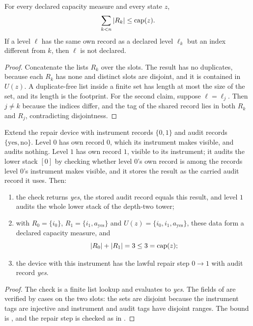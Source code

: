 \begin{theorem}\label{thm:e2-declared}
For every declared capacity measure and every state $z$,
\[
  \sum_{k<n} |R_k| \le \operatorname{cap}(z).
\]
If a level $\ell$ has the same own record as a declared level $\ell_k$ but an index different
from $k$, then $\ell$ is not declared.
\end{theorem}

\begin{proof}
Concatenate the lists $R_k$ over the slots. The result has no duplicates, because each $R_k$ has
none and distinct slots are disjoint, and it is contained in $U(z)$. A duplicate-free list inside a
finite set has length at most the size of the set, and its length is the footprint. For the second
claim, suppose $\ell = \ell_j$. Then $j \ne k$ because the indices differ, and the tag of the shared
record lies in both $R_k$ and $R_j$, contradicting disjointness.
\end{proof}

\begin{theorem}\label{thm:e2-tower}
Extend the repair device with instrument records $\{0, 1\}$ and audit records $\{\text{yes},
\text{no}\}$. Level $0$ has own record $0$, which its instrument makes visible, and audits nothing.
Level $1$ has own record $1$, visible to its instrument; it audits the lower stack $[0]$ by checking
whether level $0$'s own record is among the records level $0$'s instrument makes visible, and it
stores the result as the carried audit record it uses. Then:
\begin{enumerate}
  \item the check returns \emph{yes}, the stored audit record equals this result, and level $1$
    audits the whole lower stack of the depth-two tower;
  \item with $R_0 = \{i_0\}$, $R_1 = \{i_1, a_{\mathrm{yes}}\}$ and
    $U(z) = \{i_0, i_1, a_{\mathrm{yes}}\}$, these data form a declared capacity measure, and
    \[
      |R_0| + |R_1| = 3 \le 3 = \operatorname{cap}(z);
    \]
  \item the device with this instrument has the lawful repair step $0 \to 1$ with audit record
    \emph{yes}.
\end{enumerate}
\end{theorem}

\begin{proof}
The check is a finite list lookup and evaluates to \emph{yes}. The fields of
 are verified by cases on the two slots: the sets are disjoint because
the instrument tags are injective and instrument and audit tags have disjoint ranges. The bound is
, and the repair step is checked as in .
\end{proof}

